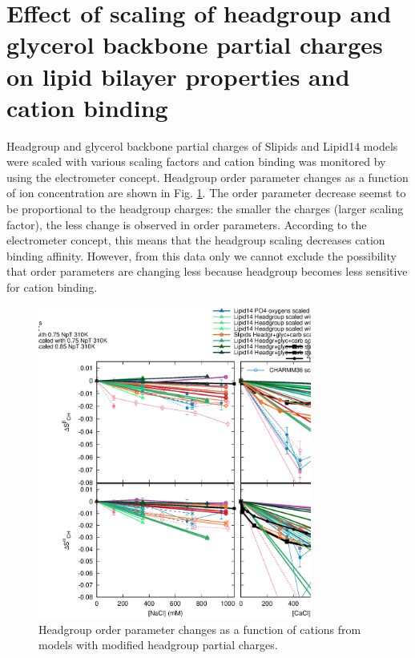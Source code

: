 \documentclass[aip,jcp,twocolumn]{revtex4}
\begin{document}


\section{Effect of scaling of headgroup and glycerol backbone partial charges on lipid bilayer properties and cation binding}

Headgroup and glycerol backbone partial charges of Slipids and Lipid14 models were scaled
with various scaling factors and cation binding was monitored by using the electrometer
concept. Headgroup order parameter changes as a function of ion concentration are
shown in Fig. \ref{OrderParameterIONSchangesSCALED}. The order parameter decrease
seemst to be proportional to the headgroup charges: the smaller the charges
(larger scaling factor), the less change is observed in order parameters.
According to the electrometer concept, this means that the headgroup scaling
decreases cation binding affinity. However, from this data only we cannot
exclude the possibility that order parameters are changing less because
headgroup becomes less sensitive for cation binding.
\begin{figure}[]
  \centering
  \includegraphics[width=9.0cm]{../Fig/OrderParameterIONSchangesSCALED.eps}
  \caption{\label{OrderParameterIONSchangesSCALED}
    Headgroup order parameter changes as a function of cations from models
    with modified headgroup partial charges.}
\end{figure}
\end{document}
